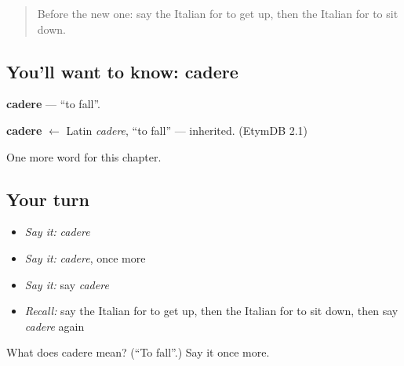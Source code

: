 \begin{quote}
Before the new one: say the Italian for to get up, then the Italian for to sit down.
\end{quote}

\subsection*{You'll want to know: cadere}
\textbf{cadere} — \textquotedblleft{}to fall\textquotedblright{}.

\begin{cousinweb}
\textbf{cadere} $\leftarrow$ Latin \emph{cadere}, \textquotedblleft{}to fall\textquotedblright{} — inherited. (EtymDB 2.1)
\end{cousinweb}

\begin{grammarlens}[title={What you've built}]
One more word for this chapter.
\end{grammarlens}

\subsection*{Your turn}
\begin{itemize}
\raggedright
  \item \emph{Say it:} \emph{cadere}
  \item \emph{Say it:} \emph{cadere}, once more
  \item \emph{Say it:} say \emph{cadere}
  \item \emph{Recall:} say the Italian for to get up, then the Italian for to sit down, then say \emph{cadere} again
\end{itemize}

\begin{tcolorbox}[breakable,colback=teal!4,colframe=teal!35!black,title={Before you move on}]
What does cadere mean? (\textquotedblleft{}To fall\textquotedblright{}.) Say it once more.
\end{tcolorbox}
